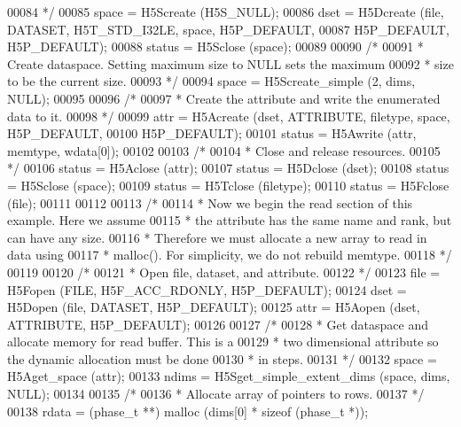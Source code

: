 \begin{DoxyCode}
00084 \textcolor{comment}{     */}
00085     space = H5Screate (H5S\_NULL);
00086     dset = H5Dcreate (file, DATASET, H5T\_STD\_I32LE, space, H5P\_DEFAULT,
00087                 H5P\_DEFAULT, H5P\_DEFAULT);
00088     status = H5Sclose (space);
00089 
00090     \textcolor{comment}{/*}
00091 \textcolor{comment}{     * Create dataspace.  Setting maximum size to NULL sets the maximum}
00092 \textcolor{comment}{     * size to be the current size.}
00093 \textcolor{comment}{     */}
00094     space = H5Screate\_simple (2, dims, NULL);
00095 
00096     \textcolor{comment}{/*}
00097 \textcolor{comment}{     * Create the attribute and write the enumerated data to it.}
00098 \textcolor{comment}{     */}
00099     attr = H5Acreate (dset, ATTRIBUTE, filetype, space, H5P\_DEFAULT,
00100                 H5P\_DEFAULT);
00101     status = H5Awrite (attr, memtype, wdata[0]);
00102 
00103     \textcolor{comment}{/*}
00104 \textcolor{comment}{     * Close and release resources.}
00105 \textcolor{comment}{     */}
00106     status = H5Aclose (attr);
00107     status = H5Dclose (dset);
00108     status = H5Sclose (space);
00109     status = H5Tclose (filetype);
00110     status = H5Fclose (file);
00111 
00112 
00113     \textcolor{comment}{/*}
00114 \textcolor{comment}{     * Now we begin the read section of this example.  Here we assume}
00115 \textcolor{comment}{     * the attribute has the same name and rank, but can have any size.}
00116 \textcolor{comment}{     * Therefore we must allocate a new array to read in data using}
00117 \textcolor{comment}{     * malloc().  For simplicity, we do not rebuild memtype.}
00118 \textcolor{comment}{     */}
00119 
00120     \textcolor{comment}{/*}
00121 \textcolor{comment}{     * Open file, dataset, and attribute.}
00122 \textcolor{comment}{     */}
00123     file = H5Fopen (FILE, H5F\_ACC\_RDONLY, H5P\_DEFAULT);
00124     dset = H5Dopen (file, DATASET, H5P\_DEFAULT);
00125     attr = H5Aopen (dset, ATTRIBUTE, H5P\_DEFAULT);
00126 
00127     \textcolor{comment}{/*}
00128 \textcolor{comment}{     * Get dataspace and allocate memory for read buffer.  This is a}
00129 \textcolor{comment}{     * two dimensional attribute so the dynamic allocation must be done}
00130 \textcolor{comment}{     * in steps.}
00131 \textcolor{comment}{     */}
00132     space = H5Aget\_space (attr);
00133     ndims = H5Sget\_simple\_extent\_dims (space, dims, NULL);
00134 
00135     \textcolor{comment}{/*}
00136 \textcolor{comment}{     * Allocate array of pointers to rows.}
00137 \textcolor{comment}{     */}
00138     rdata = (phase\_t **) malloc (dims[0] * \textcolor{keyword}{sizeof} (phase\_t *));

\end{DoxyCode}
